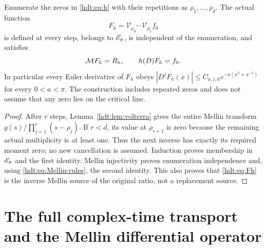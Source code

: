 \begin{hdttheorem}
\label{hdt:thm:divisor}
Enumerate the zeros in \eqref{hdt:eq:h} with their repetitions as
$\rho_1,\ldots,\rho_d$. The actual function
\begin{equation}\label{hdt:eq:Fh}
F_h=\mathcal V_{\rho_d}\cdots\mathcal V_{\rho_1}f_0
\end{equation}
is defined at every step, belongs to $\mathscr E_\pi$, is independent of the
enumeration, and satisfies
\begin{equation}\label{hdt:eq:Fh-identities}
\mathcal M F_h=R_h,\qquad h(D)F_h=f_0.
\end{equation}
In particular every Euler derivative of $F_h$ obeys
$|D^jF_h(x)|\leq C_{a,j,h}e^{-a(x^2+x^{-2})}$ for every
$0<a<\pi$. The construction includes repeated zeros and does not
assume that any zero lies on the critical line.
\end{hdttheorem}
\begin{proof}
After $r$ steps, Lemma~\ref{hdt:lem:volterra} gives the entire Mellin
transform $g(s)/\prod_{j=1}^r(s-\rho_j)$. If $r<d$, its value at
$\rho_{r+1}$ is zero because the remaining actual multiplicity is
at least one. Thus the next inverse has exactly its required moment
zero; no new cancellation is assumed. Induction proves membership
in $\mathscr E_\pi$ and the first identity. Mellin injectivity proves
enumeration independence and, using \eqref{hdt:eq:Mellin-rules}, the
second identity. This also proves that \eqref{hdt:eq:Fh} is the inverse
Mellin source of the original ratio, not a replacement source.
\end{proof}

\section{The full complex-time transport and the Mellin differential operator}

